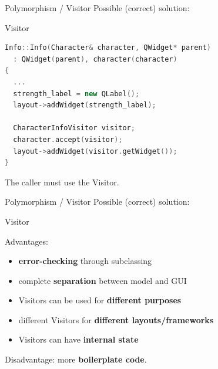 \documentclass[11pt]{beamer}
\renewcommand{\emph}[1]{\textbf{#1}}
\begin{document}
\begin{frame}[fragile]{Polymorphism / Visitor}
 Possible (correct) solution:
 
 \begin{center}
  Visitor
 \end{center}
 
  \begin{lstlisting}[language=C++]
Info::Info(Character& character, QWidget* parent)
  : QWidget(parent), character(character)
{
  ...
  strength_label = new QLabel();
  layout->addWidget(strength_label);
  
  CharacterInfoVisitor visitor;
  character.accept(visitor);
  layout->addWidget(visitor.getWidget());
}
\end{lstlisting}
 
 The caller must use the Visitor.
\end{frame}

\begin{frame}[fragile]{Polymorphism / Visitor}
 Possible (correct) solution:
 
 \begin{center}
  Visitor
 \end{center}
 
 Advantages:
 \begin{itemize}
  \item \emph{error-checking} through subclassing
  \item complete \emph{separation} between model and GUI
  \item Visitors can be used for \emph{different purposes}
  \item different Visitors for \emph{different layouts/frameworks}
  \item Visitors can have \emph{internal state}
 \end{itemize}
 
 Disadvantage: more \emph{boilerplate code}.
\end{frame}
\end{document}
